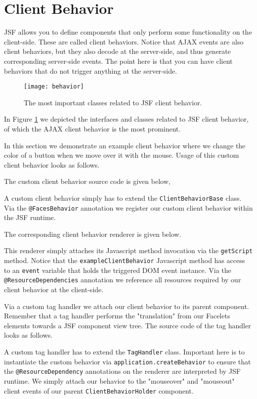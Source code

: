 \section{Client Behavior}
JSF allows you to define components that only perform some functionality on the client-side.
These are called client behaviors.
Notice that AJAX events are also client behaviors, but they also decode at the server-side, and thus generate corresponding server-side events.
The point here is that you can have client behaviors that do not trigger anything at the server-side.
\begin{figure}[htbp]
	\begin{center}
		\texttt{[image: behavior]}
		\caption{The most important classes related to JSF client behavior.}
		\label{fig:behavior}
	\end{center}
\end{figure}
In Figure \ref{fig:behavior} we depicted the interfaces and classes related to JSF client behavior, of which the AJAX client behavior is the most prominent.

In this section we demonstrate an example client behavior where we change the color of a button when we move over it with the mouse.
Usage of this custom client behavior looks as follows.


The custom client behavior source code is given below,

A custom client behavior simply has to extend the \texttt{ClientBehaviorBase} class.
Via the \texttt{@FacesBehavior} annotation we register our custom client behavior within the JSF runtime.

The corresponding client behavior renderer is given below.

This renderer simply attaches its Javascript method invocation via the \texttt{getScript} method.
Notice that the \texttt{exampleClientBehavior} Javascript method has access to an \texttt{event} variable that holds the triggered DOM event instance.
Via the \texttt{@ResourceDependencies} annotation we reference all resources required by our client behavior at the client-side.

Via a custom tag handler we attach our client behavior to its parent component.
Remember that a tag handler performs the "translation" from our Facelets elements towards a JSF component view tree.
The source code of the tag handler looks as follows.

A custom tag handler has to extend the \texttt{TagHandler} class.
Important here is to instantiate the custom behavior via \texttt{application.createBehavior} to ensure that the \texttt{@ResourceDependency} annotations on the renderer are interpreted by JSF runtime.
We simply attach our behavior to the "mouseover" and "mouseout" client events of our parent \texttt{ClientBehaviorHolder} component.

